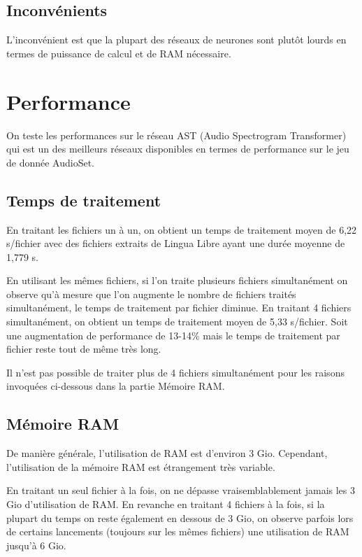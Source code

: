 \documentclass{article}
\begin{document}
\subsection{Inconvénients}

L’inconvénient est que la plupart des réseaux de neurones sont plutôt lourds en termes de puissance de calcul et de RAM nécessaire.


\section{Performance}

On teste les performances sur le réseau AST (Audio Spectrogram Transformer) qui est un des meilleurs réseaux disponibles en termes de performance sur le jeu de donnée AudioSet.

\subsection{Temps de traitement}

En traitant les fichiers un à un, on obtient un temps de traitement moyen de 6,22 s/fichier avec des fichiers extraits de Lingua Libre ayant une durée moyenne de 1,779 s.

En utilisant les mêmes fichiers, si l’on traite plusieurs fichiers simultanément on observe qu’à mesure que l’on augmente le nombre de fichiers traités simultanément, le temps de traitement par fichier diminue. En traitant 4 fichiers simultanément, on obtient un temps de traitement moyen de 5,33 s/fichier. Soit une augmentation de performance de 13-14\% mais le temps de traitement par fichier reste tout de même très long. 

Il n’est pas possible de traiter plus de 4 fichiers simultanément pour les raisons invoquées ci-dessous dans la partie Mémoire RAM.

\subsection{Mémoire RAM}

De manière générale, l’utilisation de RAM est d’environ 3 Gio. Cependant, l’utilisation de la mémoire RAM est étrangement très variable.

En traitant un seul fichier à la fois, on ne dépasse vraisemblablement jamais les 3 Gio d’utilisation de RAM. En revanche en traitant 4 fichiers à la fois, si la plupart du temps on reste également en dessous de 3 Gio, on observe parfois lors de certains lancements (toujours sur les mêmes fichiers) une utilisation de RAM jusqu’à 6 Gio.
\end{document}
